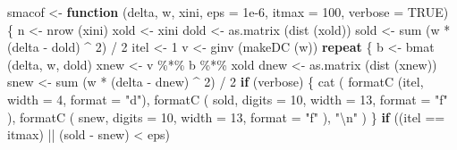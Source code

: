 \documentclass[
  12pt,
]{book}
\newenvironment{Shaded}{\begin{snugshade}}{\end{snugshade}}
\newcommand{\AttributeTok}[1]{\textcolor[rgb]{0.77,0.63,0.00}{#1}}
\newcommand{\ConstantTok}[1]{\textcolor[rgb]{0.00,0.00,0.00}{#1}}
\newcommand{\ControlFlowTok}[1]{\textcolor[rgb]{0.13,0.29,0.53}{\textbf{#1}}}
\newcommand{\DecValTok}[1]{\textcolor[rgb]{0.00,0.00,0.81}{#1}}
\newcommand{\FloatTok}[1]{\textcolor[rgb]{0.00,0.00,0.81}{#1}}
\newcommand{\FunctionTok}[1]{\textcolor[rgb]{0.00,0.00,0.00}{#1}}
\newcommand{\NormalTok}[1]{#1}
\newcommand{\OtherTok}[1]{\textcolor[rgb]{0.56,0.35,0.01}{#1}}
\newcommand{\SpecialCharTok}[1]{\textcolor[rgb]{0.00,0.00,0.00}{#1}}
\newcommand{\StringTok}[1]{\textcolor[rgb]{0.31,0.60,0.02}{#1}}
\theoremstyle{definition}
\theoremstyle{definition}
\theoremstyle{definition}
\theoremstyle{definition}
\theoremstyle{remark}
\begin{document}
\begin{Shaded}
\begin{Highlighting}[]
\NormalTok{smacof }\OtherTok{\textless{}{-}}
  \ControlFlowTok{function}\NormalTok{ (delta,}
\NormalTok{            w,}
\NormalTok{            xini,}
            \AttributeTok{eps =} \FloatTok{1e{-}6}\NormalTok{,}
            \AttributeTok{itmax =} \DecValTok{100}\NormalTok{,}
            \AttributeTok{verbose =} \ConstantTok{TRUE}\NormalTok{) \{}
\NormalTok{    n }\OtherTok{\textless{}{-}} \FunctionTok{nrow}\NormalTok{ (xini)}
\NormalTok{    xold }\OtherTok{\textless{}{-}}\NormalTok{ xini}
\NormalTok{    dold }\OtherTok{\textless{}{-}} \FunctionTok{as.matrix}\NormalTok{ (}\FunctionTok{dist}\NormalTok{ (xold))}
\NormalTok{    sold }\OtherTok{\textless{}{-}} \FunctionTok{sum}\NormalTok{ (w }\SpecialCharTok{*}\NormalTok{ (delta }\SpecialCharTok{{-}}\NormalTok{ dold) }\SpecialCharTok{\^{}} \DecValTok{2}\NormalTok{) }\SpecialCharTok{/} \DecValTok{2}
\NormalTok{    itel }\OtherTok{\textless{}{-}} \DecValTok{1}
\NormalTok{    v }\OtherTok{\textless{}{-}} \FunctionTok{ginv}\NormalTok{ (}\FunctionTok{makeDC}\NormalTok{ (w))}
    \ControlFlowTok{repeat}\NormalTok{ \{}
\NormalTok{      b }\OtherTok{\textless{}{-}} \FunctionTok{bmat}\NormalTok{ (delta, w, dold)}
\NormalTok{      xnew }\OtherTok{\textless{}{-}}\NormalTok{ v }\SpecialCharTok{\%*\%}\NormalTok{ b }\SpecialCharTok{\%*\%}\NormalTok{ xold}
\NormalTok{      dnew }\OtherTok{\textless{}{-}} \FunctionTok{as.matrix}\NormalTok{ (}\FunctionTok{dist}\NormalTok{ (xnew))}
\NormalTok{      snew }\OtherTok{\textless{}{-}} \FunctionTok{sum}\NormalTok{ (w }\SpecialCharTok{*}\NormalTok{ (delta }\SpecialCharTok{{-}}\NormalTok{ dnew) }\SpecialCharTok{\^{}} \DecValTok{2}\NormalTok{) }\SpecialCharTok{/} \DecValTok{2}
      \ControlFlowTok{if}\NormalTok{ (verbose) \{}
        \FunctionTok{cat}\NormalTok{ (}
          \FunctionTok{formatC}\NormalTok{ (itel, }\AttributeTok{width =} \DecValTok{4}\NormalTok{, }\AttributeTok{format =} \StringTok{"d"}\NormalTok{),}
          \FunctionTok{formatC}\NormalTok{ (}
\NormalTok{            sold,}
            \AttributeTok{digits =} \DecValTok{10}\NormalTok{,}
            \AttributeTok{width =} \DecValTok{13}\NormalTok{,}
            \AttributeTok{format =} \StringTok{"f"}
\NormalTok{          ),}
          \FunctionTok{formatC}\NormalTok{ (}
\NormalTok{            snew,}
            \AttributeTok{digits =} \DecValTok{10}\NormalTok{,}
            \AttributeTok{width =} \DecValTok{13}\NormalTok{,}
            \AttributeTok{format =} \StringTok{"f"}
\NormalTok{          ),}
          \StringTok{"}\SpecialCharTok{\textbackslash{}n}\StringTok{"}
\NormalTok{        )}
\NormalTok{      \}}
      \ControlFlowTok{if}\NormalTok{ ((itel }\SpecialCharTok{==}\NormalTok{ itmax) }\SpecialCharTok{||}\NormalTok{ (sold }\SpecialCharTok{{-}}\NormalTok{ snew) }\SpecialCharTok{\textless{}}\NormalTok{ eps)}

\end{Highlighting}
\end{Shaded}
\end{document}
